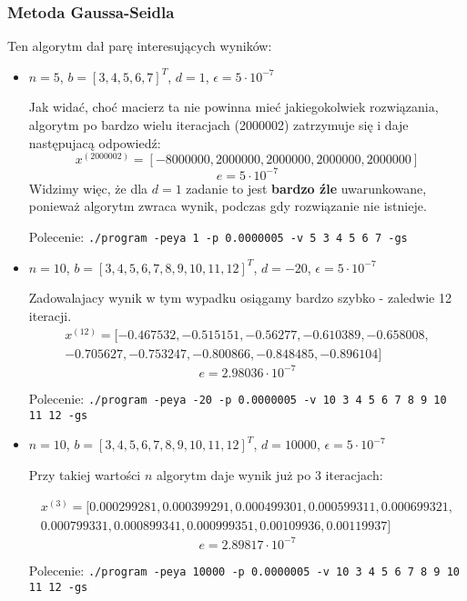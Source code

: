 \documentclass[a4paper,11pt]{article}
\begin{document}
\subsubsection{Metoda Gaussa-Seidla}
  Ten algorytm dał parę interesujących wyników:
  \begin{itemize}
    \item $ n = 5 $, $ b = [3, 4, 5, 6, 7]^T$, $ d = 1 $, $ \epsilon = 5 \cdot 10^{-7} $
    
      Jak widać, choć macierz ta nie powinna mieć jakiegokolwiek rozwiązania, algorytm po bardzo wielu iteracjach
       (2000002) zatrzymuje się i daje następujacą odpowiedź:
      $$ x^{(2000002)} = [-8000000, 2000000, 2000000, 2000000, 2000000]$$
      $$ e = 5 \cdot 10^{-7} $$
      Widzimy więc, że dla $ d = 1 $ zadanie to jest \textbf{bardzo źle} uwarunkowane, ponieważ algorytm
      zwraca wynik, podczas gdy rozwiązanie nie istnieje.
      
      Polecenie: \texttt{./program -peya 1 -p 0.0000005 -v 5 3 4 5 6 7 -gs}
      
    \item $ n = 10 $, $ b = [3, 4, 5, 6, 7, 8, 9, 10, 11, 12]^T$, $ d = -20 $, $ \epsilon = 5 \cdot 10^{-7} $
      
      Zadowalajacy wynik w tym wypadku osiągamy bardzo szybko - zaledwie 12 iteracji.
      \begin{align*}
        x^{(12)} = [-0.467532, -0.515151, -0.56277, -0.610389, -0.658008, \\ -0.705627, -0.753247, -0.800866, -0.848485, -0.896104]
      \end{align*}
      $$ e = 2.98036 \cdot 10^{-7} $$
      
      Polecenie: \texttt{./program -peya -20 -p 0.0000005 -v 10 3 4 5 6 7 8 9 10 11 12 -gs}
      
    \item $ n = 10 $, $ b = [3, 4, 5, 6, 7, 8, 9, 10, 11, 12]^T$, $ d = 10000 $, $ \epsilon = 5 \cdot 10^{-7} $
    
      Przy takiej wartości $ n $ algorytm daje wynik już po 3 iteracjach:
        
      \begin{align*}
        x^{(3)} = [0.000299281, 0.000399291, 0.000499301, 0.000599311, 0.000699321, \\ 0.000799331, 0.000899341, 0.000999351, 0.00109936, 0.00119937]
      \end{align*}
      $$ e = 2.89817 \cdot 10^{-7} $$
      
      Polecenie: \texttt{./program -peya 10000 -p 0.0000005 -v 10 3 4 5 6 7 8 9 10 11 12 -gs}  
  \end{itemize}
\end{document}
